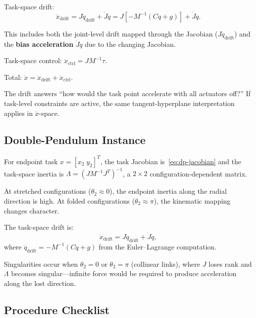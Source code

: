\documentclass[11pt]{article}
\begin{document}
Task-space drift:
\begin{equation}\label{eq:os-drift}
\ddot{x}_{\mathrm{drift}} = J\ddot{q}_{\mathrm{drift}} + \dot{J}\dot{q} = J[-M^{-1}(C\dot{q}+g)] + \dot{J}\dot{q}.
\end{equation}

This includes both the joint-level drift mapped through the Jacobian ($J\ddot{q}_{\mathrm{drift}}$) and the \textbf{bias acceleration} $\dot{J}\dot{q}$ due to the changing Jacobian.

Task-space control: $\ddot{x}_{\mathrm{ctrl}} = JM^{-1}\tau$.

Total: $\ddot{x} = \ddot{x}_{\mathrm{drift}} + \ddot{x}_{\mathrm{ctrl}}$.

The drift answers ``how would the task point accelerate with all actuators off?''
If task-level constraints are active, the same tangent-hyperplane interpretation applies in $\ddot{x}$-space.

\subsection{Double-Pendulum Instance}

For endpoint task $x=[x_2\;y_2]^T$, the task Jacobian is~\eqref{eq:dp-jacobian} and the task-space inertia is $\Lambda=(JM^{-1}J^T)^{-1}$, a $2\times 2$ configuration-dependent matrix.

At stretched configurations ($\theta_2\approx 0$), the endpoint inertia along the radial direction is high.
At folded configurations ($\theta_2\approx\pi$), the kinematic mapping changes character.

The task-space drift is:
\begin{equation}
\ddot{x}_{\mathrm{drift}} = J\ddot{q}_{\mathrm{drift}} + \dot{J}\dot{q},
\end{equation}
where $\ddot{q}_{\mathrm{drift}}=-M^{-1}(C\dot{q}+g)$ from the Euler--Lagrange computation.

Singularities occur when $\theta_2=0$ or $\theta_2=\pi$ (collinear links), where $J$ loses rank and $\Lambda$ becomes singular---infinite force would be required to produce acceleration along the lost direction.

\subsection{Procedure Checklist}
\end{document}
